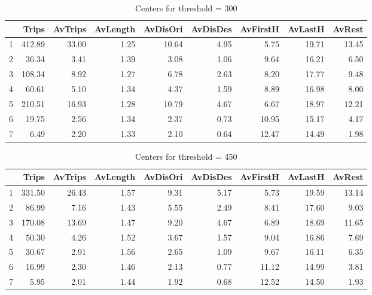 \begin{table*}[ht]
\centering
\begin{tabular}{rrrrrrrrr}
  \hline
 & Trips & AvTrips & AvLength & AvDisOri & AvDisDes & AvFirstH & AvLastH & AvRest \\
  \hline
1 & 412.89 & 33.00 & 1.25 & 10.64 & 4.95 & 5.75 & 19.71 & 13.45 \\
  2 & 36.34 & 3.41 & 1.39 & 3.08 & 1.06 & 9.64 & 16.21 & 6.50 \\
  3 & 108.34 & 8.92 & 1.27 & 6.78 & 2.63 & 8.20 & 17.77 & 9.48 \\
  4 & 60.61 & 5.10 & 1.34 & 4.37 & 1.59 & 8.89 & 16.98 & 8.00 \\
  5 & 210.51 & 16.93 & 1.28 & 10.79 & 4.67 & 6.67 & 18.97 & 12.21 \\
  6 & 19.75 & 2.56 & 1.34 & 2.37 & 0.73 & 10.95 & 15.17 & 4.17 \\
  7 & 6.49 & 2.20 & 1.33 & 2.10 & 0.64 & 12.47 & 14.49 & 1.98 \\
   \hline
\end{tabular}
\caption{Centers for threshold = 300}
\end{table*}

\begin{table*}[ht]
\centering
\begin{tabular}{rrrrrrrrr}
  \hline
 & Trips & AvTrips & AvLength & AvDisOri & AvDisDes & AvFirstH & AvLastH & AvRest \\  \hline
1 & 331.50 & 26.43 & 1.57 & 9.31 & 5.17 & 5.73 & 19.59 & 13.14 \\
  2 & 86.99 & 7.16 & 1.43 & 5.55 & 2.49 & 8.41 & 17.60 & 9.03 \\
  3 & 170.08 & 13.69 & 1.47 & 9.20 & 4.67 & 6.89 & 18.69 & 11.65 \\
  4 & 50.30 & 4.26 & 1.52 & 3.67 & 1.57 & 9.04 & 16.86 & 7.69 \\
  5 & 30.67 & 2.91 & 1.56 & 2.65 & 1.09 & 9.67 & 16.11 & 6.35 \\
  6 & 16.99 & 2.30 & 1.46 & 2.13 & 0.77 & 11.12 & 14.99 & 3.81 \\
  7 & 5.95 & 2.01 & 1.44 & 1.92 & 0.68 & 12.52 & 14.50 & 1.93 \\
   \hline
\end{tabular}
\caption{Centers for threshold = 450}
\end{table*}


